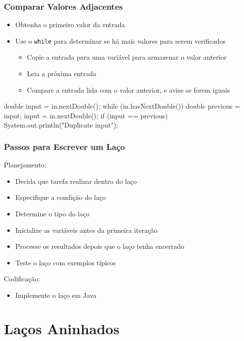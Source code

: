 \documentclass[xcolor={dvipsnames,table},aspectratio=169]{beamer}
\begin{document}
\begin{frame}[fragile]\frametitle{Comparar Valores Adjacentes}
\begin{itemize}
	\item Obtenha o primeiro valor da entrada
	\item Use o \texttt{while} para determinar se há mais valores para serem verificados
	\begin{itemize}
		\item Copie a entrada para uma variável para armazenar o valor anterior		
		\item Leia a próxima entrada
		\item Compare a entrada lida com o valor anterior, e avise se forem iguais
	\end{itemize}
\end{itemize}
\begin{javacode}
double input = in.nextDouble();
while (in.hasNextDouble()) {
   double previous = input;
   input = in.nextDouble();
   if (input == previous) { 
      System.out.println("Duplicate input"); 
   }
}
\end{javacode}
\end{frame}

\begin{frame}\frametitle{Passos para Escrever um Laço}
Planejamento:
\begin{itemize}
	\item Decida que tarefa realizar dentro do laço
	\item Especifique a condição do laço
	\item Determine o tipo do laço
	\item Inicialize as variáveis antes da primeira iteração
	\item Processe os resultados depois que o laço tenha encerrado
	\item Teste o laço com exemplos típicos
\end{itemize}
Codificação:
\begin{itemize}
	\item Implemente o laço em Java
\end{itemize}
\end{frame}

\section{Laços Aninhados}
\end{document}
